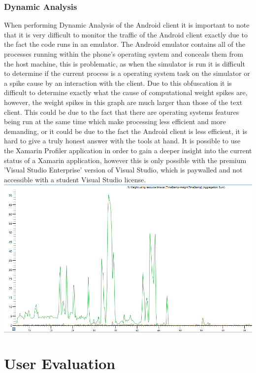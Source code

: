 \documentclass{article}
\begin{document}
\subsubsection{Dynamic Analysis}
When performing Dynamic Analysis of the Android client it is important to note that it is very difficult to monitor the traffic of the Android client exactly due to the fact the code runs in an emulator. The Android emulator contains all of the processes running within the phone's operating system and conceals them from the host machine, this is problematic, as when the simulator is run it is difficult to determine if the current process is a operating system task on the simulator or a spike cause by an interaction with the client. Due to this obfuscation it is difficult to determine exactly what the cause of computational weight spikes are, however, the weight spikes in this graph are much larger than those of the text client. This could be due to the fact that there are operating systems features being run at the same time which make processing less efficient and more demanding, or it could be due to the fact the Android client is less efficient, it is hard to give a truly honest answer with the tools at hand. It is possible to use the Xamarin Profiler application in order to gain a deeper insight into the current status of a Xamarin application, however this is only possible with the premium 'Visual Studio Enterprise' version of Visual Studio, which is paywalled and not accessible with a student Visual Studio license.
\includegraphics[width=\textwidth]{androidgraph.PNG}
\section{User Evaluation}
\end{document}
